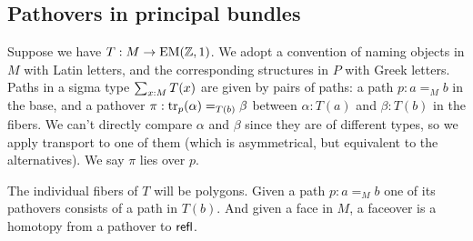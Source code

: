 \subsection{Pathovers in principal bundles}
Suppose we have \( T:M\to\mathrm{EM}(\mathbb{Z},1) \). We adopt a convention of naming objects in \( M \) with Latin letters, and the corresponding structures in \( P \) with Greek letters. Paths in a sigma type \( \sum_{x:M}T(x) \) are given by pairs of paths: a path \( p:a=_M b \) in the base, and a pathover \( \pi:\mathrm{tr}_p(\alpha)=_{T(b)}\beta \) between \( \alpha:T(a) \) and \( \beta:T(b) \) in the fibers. We can't directly compare \( \alpha \) and \( \beta \) since they are of different types, so we apply transport to one of them (which is asymmetrical, but equivalent to the alternatives). We say \( \pi \) lies over \( p \). 

The individual fibers of \( T \) will be polygons. Given a path \( p:a=_M b \) one of its pathovers consists of a path in \( T(b) \). And given a face in \( M \), a faceover is a homotopy from a pathover to \( \mathsf{refl} \).

